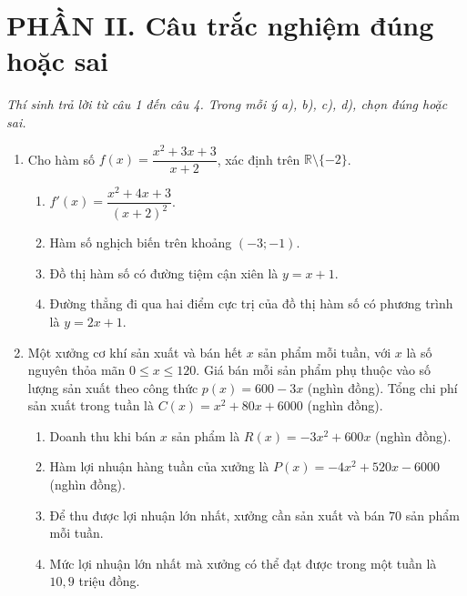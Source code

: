 \documentclass[12pt,a4paper]{article}
\begin{document}
\section*{\large PHẦN II. Câu trắc nghiệm đúng hoặc sai}
\textit{Thí sinh trả lời từ câu 1 đến câu 4. Trong mỗi ý a), b), c), d), chọn đúng hoặc sai.}
\begin{enumerate}
\item Cho hàm số $f(x)=\dfrac{x^2+3x+3}{x+2}$, xác định trên $\mathbb R\setminus\{-2\}$.
\begin{enumerate}
\item $f'(x)=\dfrac{x^2+4x+3}{(x+2)^2}$.
\item Hàm số nghịch biến trên khoảng $(-3;-1)$.
\item Đồ thị hàm số có đường tiệm cận xiên là $y=x+1$.
\item Đường thẳng đi qua hai điểm cực trị của đồ thị hàm số có phương trình là $y=2x+1$.
\end{enumerate}

\item Một xưởng cơ khí sản xuất và bán hết $x$ sản phẩm mỗi tuần, với $x$ là số nguyên thỏa mãn $0\le x\le120$. Giá bán mỗi sản phẩm phụ thuộc vào số lượng sản xuất theo công thức $p(x)=600-3x$ (nghìn đồng). Tổng chi phí sản xuất trong tuần là $C(x)=x^2+80x+6000$ (nghìn đồng).
\begin{enumerate}
\item Doanh thu khi bán $x$ sản phẩm là $R(x)=-3x^2+600x$ (nghìn đồng).
\item Hàm lợi nhuận hàng tuần của xưởng là $P(x)=-4x^2+520x-6000$ (nghìn đồng).
\item Để thu được lợi nhuận lớn nhất, xưởng cần sản xuất và bán $70$ sản phẩm mỗi tuần.
\item Mức lợi nhuận lớn nhất mà xưởng có thể đạt được trong một tuần là $10{,}9$ triệu đồng.
\end{enumerate}
\end{enumerate}
\end{document}
